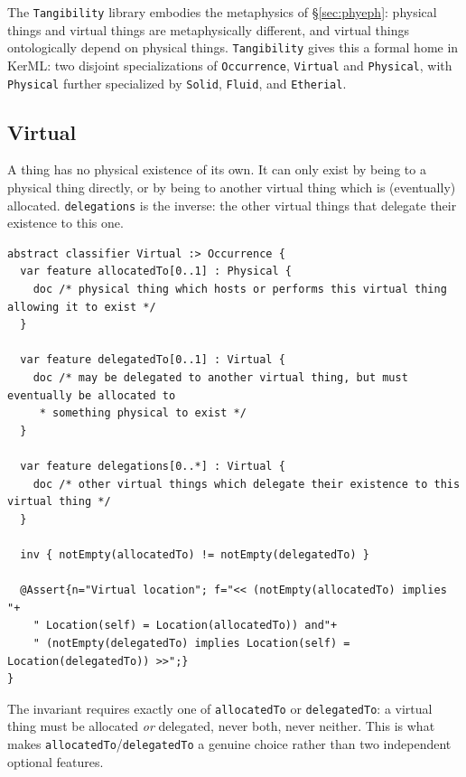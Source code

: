 
\label{tangibility}

\pn The \texttt{Tangibility} library embodies the metaphysics of \S\ref{sec:phyeph}: physical things
and virtual things are metaphysically different, and virtual things ontologically depend on
physical things.  \texttt{Tangibility} gives this a formal home in KerML: two disjoint
specializations of \texttt{Occurrence}, \texttt{Virtual} and \texttt{Physical}, with \texttt{Physical}
further specialized by \texttt{Solid}, \texttt{Fluid}, and \texttt{Etherial}.

\subsection{Virtual}\label{subsec:virtual}

\pn A  thing has no physical existence of its own.  It can only exist
by being  to a physical thing directly, or by being
 to another virtual thing which is (eventually) allocated.
\texttt{delegations} is the inverse:  the other virtual things that delegate their existence to this one.

\begin{lstlisting}
abstract classifier Virtual :> Occurrence {
  var feature allocatedTo[0..1] : Physical {
    doc /* physical thing which hosts or performs this virtual thing allowing it to exist */
  }

  var feature delegatedTo[0..1] : Virtual {
    doc /* may be delegated to another virtual thing, but must eventually be allocated to
     * something physical to exist */
  }

  var feature delegations[0..*] : Virtual {
    doc /* other virtual things which delegate their existence to this virtual thing */
  }

  inv { notEmpty(allocatedTo) != notEmpty(delegatedTo) }

  @Assert{n="Virtual location"; f="<< (notEmpty(allocatedTo) implies "+
  	" Location(self) = Location(allocatedTo)) and"+
    " (notEmpty(delegatedTo) implies Location(self) = Location(delegatedTo)) >>";}
}
\end{lstlisting}

\pn The invariant requires exactly one of \texttt{allocatedTo} or \texttt{delegatedTo}: a virtual
thing must be allocated \emph{or} delegated, never both, never neither.  This is what makes
\texttt{allocatedTo}/\texttt{delegatedTo} a genuine choice rather than two independent optional
features.

